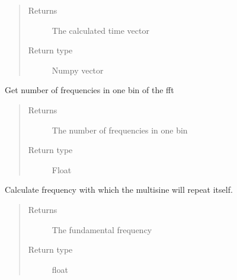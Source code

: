 \documentclass[letterpaper,10pt,english]{sphinxmanual}
\begin{document}
\begin{fulllineitems}
\begin{fulllineitems}
\begin{quote}
\begin{description}
\item[{Returns}] \leavevmode
\sphinxAtStartPar
The calculated time vector

\item[{Return type}] \leavevmode
\sphinxAtStartPar
Numpy vector

\end{description}\end{quote}

\end{fulllineitems}


\begin{fulllineitems}
\label{\detokenize{index:TiePieLCR_settings.TiePieLCR_settings.get_df}}
\sphinxAtStartPar
Get number of frequencies in one bin of the fft
\begin{quote}\begin{description}
\item[{Returns}] \leavevmode
\sphinxAtStartPar
The number of frequencies in one bin

\item[{Return type}] \leavevmode
\sphinxAtStartPar
Float

\end{description}\end{quote}

\end{fulllineitems}


\begin{fulllineitems}
\label{\detokenize{index:TiePieLCR_settings.TiePieLCR_settings.get_f_fun}}
\sphinxAtStartPar
Calculate frequency with which the multisine will repeat itself.
\begin{quote}\begin{description}
\item[{Returns}] \leavevmode
\sphinxAtStartPar
The fundamental frequency

\item[{Return type}] \leavevmode
\sphinxAtStartPar
float

\end{description}\end{quote}


\end{fulllineitems}
\end{fulllineitems}
\end{document}
